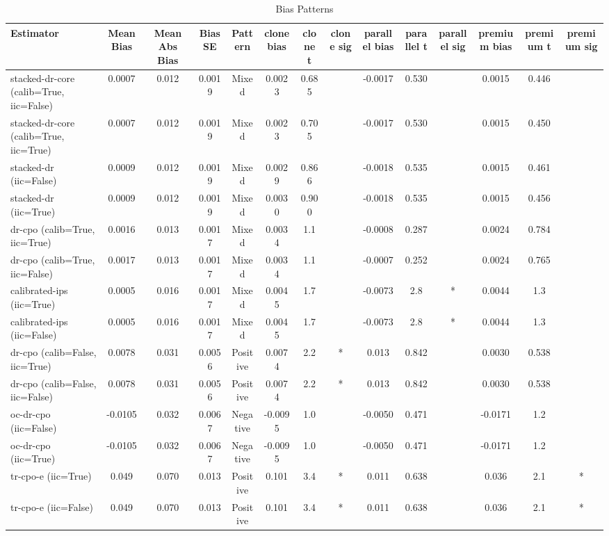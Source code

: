 \begin{table}[htbp]
\centering
\caption{Bias Patterns}
\label{tab:A2}
\begin{tabular}{l|ccccccccccccc}
\toprule
Estimator & Mean Bias & Mean Abs Bias & Bias SE & Pattern & clone bias & clone t & clone sig & parallel bias & parallel t & parallel sig & premium bias & premium t & premium sig \\
\midrule
stacked-dr-core (calib=True, iic=False) & 0.0007 & 0.012 & 0.0019 & Mixed & 0.0023 & 0.685 &  & -0.0017 & 0.530 &  & 0.0015 & 0.446 &  \\
stacked-dr-core (calib=True, iic=True) & 0.0007 & 0.012 & 0.0019 & Mixed & 0.0023 & 0.705 &  & -0.0017 & 0.530 &  & 0.0015 & 0.450 &  \\
stacked-dr (iic=False) & 0.0009 & 0.012 & 0.0019 & Mixed & 0.0029 & 0.866 &  & -0.0018 & 0.535 &  & 0.0015 & 0.461 &  \\
stacked-dr (iic=True) & 0.0009 & 0.012 & 0.0019 & Mixed & 0.0030 & 0.900 &  & -0.0018 & 0.535 &  & 0.0015 & 0.456 &  \\
dr-cpo (calib=True, iic=True) & 0.0016 & 0.013 & 0.0017 & Mixed & 0.0034 & 1.1 &  & -0.0008 & 0.287 &  & 0.0024 & 0.784 &  \\
dr-cpo (calib=True, iic=False) & 0.0017 & 0.013 & 0.0017 & Mixed & 0.0034 & 1.1 &  & -0.0007 & 0.252 &  & 0.0024 & 0.765 &  \\
calibrated-ips (iic=True) & 0.0005 & 0.016 & 0.0017 & Mixed & 0.0045 & 1.7 &  & -0.0073 & 2.8 & * & 0.0044 & 1.3 &  \\
calibrated-ips (iic=False) & 0.0005 & 0.016 & 0.0017 & Mixed & 0.0045 & 1.7 &  & -0.0073 & 2.8 & * & 0.0044 & 1.3 &  \\
dr-cpo (calib=False, iic=True) & 0.0078 & 0.031 & 0.0056 & Positive & 0.0074 & 2.2 & * & 0.013 & 0.842 &  & 0.0030 & 0.538 &  \\
dr-cpo (calib=False, iic=False) & 0.0078 & 0.031 & 0.0056 & Positive & 0.0074 & 2.2 & * & 0.013 & 0.842 &  & 0.0030 & 0.538 &  \\
oc-dr-cpo (iic=False) & -0.0105 & 0.032 & 0.0067 & Negative & -0.0095 & 1.0 &  & -0.0050 & 0.471 &  & -0.0171 & 1.2 &  \\
oc-dr-cpo (iic=True) & -0.0105 & 0.032 & 0.0067 & Negative & -0.0095 & 1.0 &  & -0.0050 & 0.471 &  & -0.0171 & 1.2 &  \\
tr-cpo-e (iic=True) & 0.049 & 0.070 & 0.013 & Positive & 0.101 & 3.4 & * & 0.011 & 0.638 &  & 0.036 & 2.1 & * \\
tr-cpo-e (iic=False) & 0.049 & 0.070 & 0.013 & Positive & 0.101 & 3.4 & * & 0.011 & 0.638 &  & 0.036 & 2.1 & * \\

\end{tabular}
\end{table}
